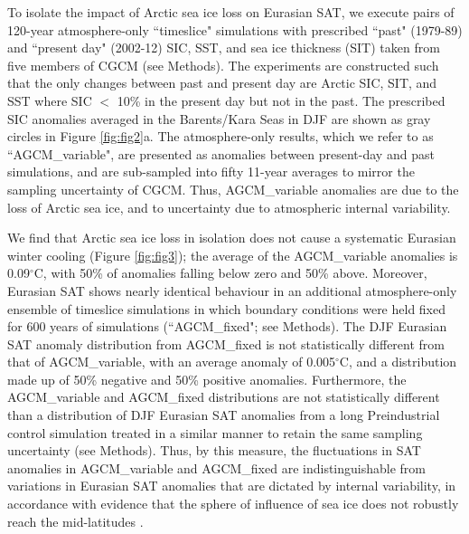 \documentclass{nature}
\begin{document}
To isolate the impact of Arctic sea ice loss on Eurasian SAT, we execute pairs of 120-year atmosphere-only ``timeslice" simulations with prescribed ``past" (1979-89) and ``present day" (2002-12) SIC, SST, and sea ice thickness (SIT) taken from five members of CGCM (see Methods). The experiments are constructed such that the only changes between past and present day are Arctic SIC, SIT, and SST where SIC $<$ 10\% in the present day but not in the past. The prescribed SIC anomalies averaged in the Barents/Kara Seas in DJF are shown as gray circles in Figure \ref{fig:fig2}a. The atmosphere-only results, which we refer to as ``AGCM\_variable", are presented as anomalies between present-day and past simulations, and are sub-sampled into fifty 11-year averages to mirror the sampling uncertainty of CGCM. Thus, AGCM\_variable anomalies are due to the loss of Arctic sea ice, and to uncertainty due to atmospheric internal variability. %

We find that Arctic sea ice loss in isolation does not cause a systematic Eurasian winter cooling (Figure \ref{fig:fig3}); the average of the AGCM\_variable anomalies is 0.09$^\circ$C, with 50\% of anomalies falling below zero and 50\% above. Moreover, Eurasian SAT shows nearly identical behaviour in an additional atmosphere-only ensemble of timeslice simulations in which boundary conditions were held fixed for 600 years of simulations (``AGCM\_fixed"; see Methods). The DJF Eurasian SAT anomaly distribution from AGCM\_fixed is not statistically different from that of AGCM\_variable, with an average anomaly of 0.005$^\circ$C, and a distribution made up of 50\% negative and 50\% positive anomalies. Furthermore, the AGCM\_variable and AGCM\_fixed distributions are not statistically different than a distribution of DJF Eurasian SAT anomalies from a long Preindustrial control simulation treated in a similar manner to retain the same sampling uncertainty (see Methods). Thus, by this measure, the fluctuations in SAT anomalies in AGCM\_variable and AGCM\_fixed are indistinguishable from variations in Eurasian SAT anomalies that are dictated by internal variability, in accordance with evidence that the sphere of influence of sea ice does not robustly reach the mid-latitudes \cite{screen14a}.  %
\end{document}
